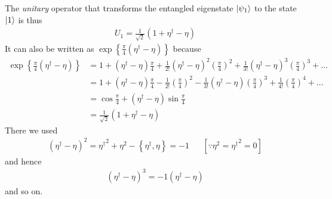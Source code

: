 The \textit{unitary} operator that transforms the entangled eigenstate \(\ket{\psi_1}\) to the state \(\ket{1}\) is thus
\begin{equation}\begin{aligned}
	\label{finalu}
	U_1 = \frac{1}{\sqrt 2}\left(1 + \eta^\dagger - \eta\right)
\end{aligned}\end{equation}
It can also be written as \(\exp\left\{\frac{\pi}{4}\left(\eta^\dagger - \eta\right)\right\}\) because
\begin{equation}\begin{aligned}
	\exp\left\{\frac{\pi}{4}\left(\eta^\dagger - \eta\right)\right\} &= 1 + \left(\eta^\dagger - \eta\right)\frac{\pi}{4} + \frac{1}{2!}\left(\eta^\dagger - \eta\right)^2\left(\frac{\pi}{4}\right)^2 + \frac{1}{3!}\left(\eta^\dagger - \eta\right)^3\left(\frac{\pi}{4}\right)^3 + ...\\
							   &= 1 + \left(\eta^\dagger - \eta\right)\frac{\pi}{4} - \frac{1}{2!}\left(\frac{\pi}{4}\right)^2 - \frac{1}{3!}\left(\eta^\dagger - \eta\right)\left(\frac{\pi}{4}\right)^3 + \frac{1}{4!}\left(\frac{\pi}{4}\right)^4 + ...\\
							   &= \cos \frac{\pi}{4} + \left(\eta^\dagger - \eta\right)\sin\frac{\pi}{4}\\
							   &= \frac{1}{\sqrt 2}\left(1 + \eta^\dagger - \eta\right)
\end{aligned}\end{equation}
There we used
\begin{equation}\begin{aligned}
	\left(\eta^\dagger - \eta\right)^2 = {\eta^\dagger}^2 + \eta^2 - \left\{\eta^\dagger,\eta\right\} = -1 &&\left[\because\eta^2 = {\eta^\dagger}^2=0\right]
\end{aligned}\end{equation}
and hence
\begin{equation}\begin{aligned}
	\left(\eta^\dagger - \eta\right)^3 = -1\left(\eta^\dagger - \eta\right)
\end{aligned}\end{equation}
and so on.
